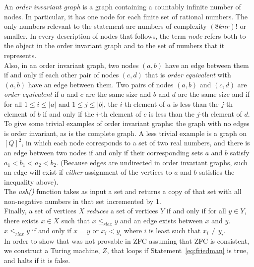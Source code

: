 An \emph{order invariant graph} is a graph containing a countably infinite number of nodes. In particular, it has one node for each finite set of rational numbers. The only numbers relevant to the statement are numbers of complexity $(8knr)!$ or smaller. In every description of nodes that follows, the term \emph{node} refers both to the object in the order invariant graph and to the set of numbers that it represents. \\

Also, in an order invariant graph, two nodes $(a,b)$ have an edge between them if and only if each other pair of nodes $(c,d)$ that is \emph{order equivalent} with $(a,b)$ have an edge between them. Two pairs of nodes $(a, b)$ and $(c, d)$ are \emph{order equivalent} if $a$ and $c$ are the same size and $b$ and $d$ are the same size and if for all $1 \le i \le |a|$ and $1 \le j \le |b|$, the $i$-th element of $a$ is less than the $j$-th element of $b$ if and only if the $i$-th element of $c$ is less than the $j$-th element of $d$. \\

To give some trivial examples of order invariant graphs: the graph with no edges is order invariant, as is the complete graph. A less trivial example is a graph on $[Q]^2$, in which each node corresponds to a set of two real numbers, and there is an edge between two nodes if and only if their corresponding sets $a$ and $b$ satisfy $a_1 < b_1 < a_2 < b_2$. (Because edges are undirected in order invariant graphs, such an edge will exist if \emph{either} assignment of the vertices to $a$ and $b$ satisfies the inequality above). \\

The \emph{ush()} function takes as input a set and returns a copy of that set with all non-negative numbers in that set incremented by 1. \\ 

Finally, a set of vertices $X$ \emph{reduces} a set of vertices $Y$ if and only if for all $y \in Y$, there exists $x \in X$ such that $x \le_{rlex} y$ and an edge exists between $x$ and $y$. $x \le_{rlex} y$ if and only if $x = y$ or $x_i < y_i$ where $i$ is least such that $x_i \not= y_i$.~\cite{personalcomm} \\

In order to show that \bbstatenum was not provable in ZFC assuming that ZFC is consistent, we construct a Turing machine, $Z$, that loops if Statement~\ref{eq:friedman} is true, and halts if it is false. 

